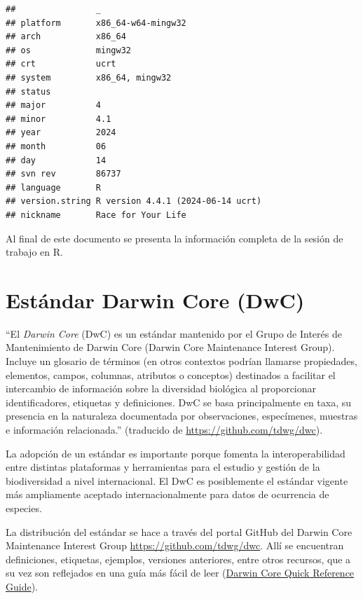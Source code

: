\documentclass[sn-apa,pdflatex]{sn-jnl}
\begin{document}
\begin{verbatim}
##                _                                
## platform       x86_64-w64-mingw32               
## arch           x86_64                           
## os             mingw32                          
## crt            ucrt                             
## system         x86_64, mingw32                  
## status                                          
## major          4                                
## minor          4.1                              
## year           2024                             
## month          06                               
## day            14                               
## svn rev        86737                            
## language       R                                
## version.string R version 4.4.1 (2024-06-14 ucrt)
## nickname       Race for Your Life
\end{verbatim}

Al final de este documento se presenta la información completa de la
sesión de trabajo en R.

\section{Estándar Darwin Core (DwC)}\label{estuxe1ndar-darwin-core-dwc}

``El \emph{Darwin Core} (DwC) \citep{Wieczorek2012} es un estándar
mantenido por el Grupo de Interés de Mantenimiento de Darwin Core
(Darwin Core Maintenance Interest Group). Incluye un glosario de
términos (en otros contextos podrían llamarse propiedades, elementos,
campos, columnas, atributos o conceptos) destinados a facilitar el
intercambio de información sobre la diversidad biológica al proporcionar
identificadores, etiquetas y definiciones. DwC se basa principalmente en
taxa, su presencia en la naturaleza documentada por observaciones,
especímenes, muestras e información relacionada.'' (traducido de
\url{https://github.com/tdwg/dwc}).

La adopción de un estándar es importante porque fomenta la
interoperabilidad entre distintas plataformas y herramientas para el
estudio y gestión de la biodiversidad a nivel internacional. El DwC es
posiblemente el estándar vigente más ampliamente aceptado
internacionalmente para datos de ocurrencia de especies.

La distribución del estándar se hace a través del portal GitHub del
Darwin Core Maintenance Interest Group
\url{https://github.com/tdwg/dwc}. Allí se encuentran definiciones,
etiquetas, ejemplos, versiones anteriores, entre otros recursos, que a
su vez son reflejados en una guía más fácil de leer
(\href{https://dwc.tdwg.org/terms/}{Darwin Core Quick Reference Guide}).
\end{document}
